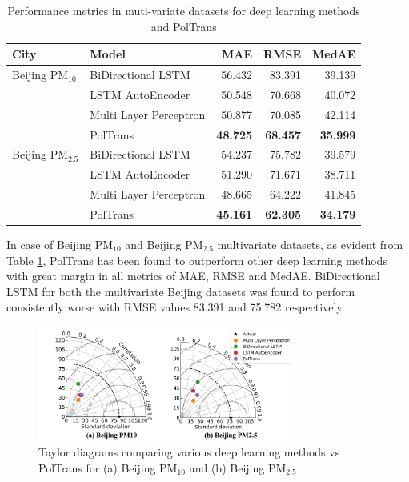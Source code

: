 \documentclass[10pt,journal]{IEEEtran}
\begin{document}
\begin{table}[h]
\small
\centering
\tabcolsep=0.12cm
\caption{Performance metrics in muti-variate datasets for deep learning methods and PolTrans}
\label{tbl:m_dl-performance}
\begin{tabular}{llrrr}
\toprule
City & Model &   MAE &    RMSE &   MedAE \\
\midrule
Beijing PM${_{10}}$ & BiDirectional LSTM &  56.432 &  83.391 &  39.139 \\
              & LSTM AutoEncoder &  50.548 &  70.668 &  40.072 \\
              & Multi Layer Perceptron &  50.877 &  70.085 &  42.114 \\
              & PolTrans &  \textbf{48.725} &  \textbf{68.457} &  \textbf{35.999} \\
Beijing PM${_{2.5}}$ & BiDirectional LSTM &  54.237 &  75.782 &  39.579 \\
              & LSTM AutoEncoder &  51.290 &  71.671 &  38.711 \\
              & Multi Layer Perceptron &  48.665 &  64.222 &  41.845 \\
              & PolTrans &  \textbf{45.161} &  \textbf{62.305} &  \textbf{34.179} \\
\bottomrule
\end{tabular}
\end{table}

In case of Beijing PM${_{10}}$ and Beijing PM${_{2.5}}$ multivariate datasets, as evident from Table \ref{tbl:m_dl-performance}, {PolTrans}  has been found to outperform other deep learning methods with great margin in all metrics of MAE, RMSE and MedAE. BiDirectional LSTM for both the multivariate Beijing datasets was found to perform consistently worse with RMSE values 83.391 and 75.782 respectively. 

\begin{figure}[h]
\centering
\includegraphics[width=8.5cm]{../paper_figures/merged_taylor_m_dl.png}
\caption{Taylor diagrams comparing various deep learning methods vs {PolTrans}  for (a) Beijing PM${_{10}}$ and (b) Beijing PM${_{2.5}}$}
\label{fig:m_dl-taylor}
\end{figure}
\end{document}
